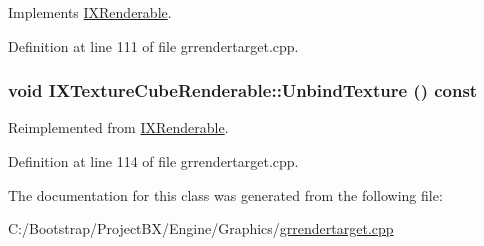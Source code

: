 Implements \hyperlink{class_i_x_renderable_aa7a8918c305cc562df3f3f44cd761d7}{IXRenderable}.

Definition at line 111 of file grrendertarget.cpp.\hypertarget{class_i_x_texture_cube_renderable_5c925a69c84be46731007be94bc415c6}{
\subsubsection[{UnbindTexture}]{\setlength{\rightskip}{0pt plus 5cm}void IXTextureCubeRenderable::UnbindTexture () const}}
\label{class_i_x_texture_cube_renderable_5c925a69c84be46731007be94bc415c6}




Reimplemented from \hyperlink{class_i_x_renderable_a6c88c0ccc0cc869114309de6843f5ac}{IXRenderable}.

Definition at line 114 of file grrendertarget.cpp.

The documentation for this class was generated from the following file:\begin{CompactItemize}
\item 
C:/Bootstrap/ProjectBX/Engine/Graphics/\hyperlink{grrendertarget_8cpp}{grrendertarget.cpp}\end{CompactItemize}
